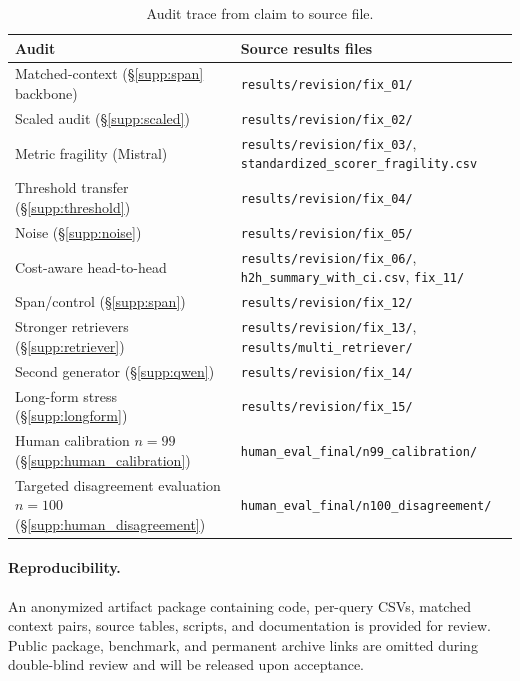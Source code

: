 \documentclass[11pt]{article}
\begin{document}
\begin{table}[!htb]
\centering
\caption{Audit trace from claim to source file.}
\label{tab:supp:trace}
\footnotesize
\begin{tabular}{ll}
\toprule
Audit & Source results files \\
\midrule
Matched-context (\S\ref{supp:span} backbone) &
  \texttt{results/revision/fix\_01/} \\
Scaled audit (\S\ref{supp:scaled}) &
  \texttt{results/revision/fix\_02/} \\
Metric fragility (Mistral) &
  \texttt{results/revision/fix\_03/}, \texttt{standardized\_scorer\_fragility.csv} \\
Threshold transfer (\S\ref{supp:threshold}) &
  \texttt{results/revision/fix\_04/} \\
Noise (\S\ref{supp:noise}) &
  \texttt{results/revision/fix\_05/} \\
Cost-aware head-to-head &
  \texttt{results/revision/fix\_06/}, \texttt{h2h\_summary\_with\_ci.csv}, \texttt{fix\_11/} \\
Span/control (\S\ref{supp:span}) &
  \texttt{results/revision/fix\_12/} \\
Stronger retrievers (\S\ref{supp:retriever}) &
  \texttt{results/revision/fix\_13/}, \texttt{results/multi\_retriever/} \\
Second generator (\S\ref{supp:qwen}) &
  \texttt{results/revision/fix\_14/} \\
Long-form stress (\S\ref{supp:longform}) &
  \texttt{results/revision/fix\_15/} \\
Human calibration $n=99$ (\S\ref{supp:human_calibration}) &
  \texttt{human\_eval\_final/n99\_calibration/} \\
Targeted disagreement evaluation $n=100$ (\S\ref{supp:human_disagreement}) &
  \texttt{human\_eval\_final/n100\_disagreement/} \\
\bottomrule
\end{tabular}
\end{table}

\paragraph{Reproducibility.} An anonymized artifact package containing
code, per-query CSVs, matched context pairs, source tables, scripts, and
documentation is provided for review. Public package, benchmark, and
permanent archive links are omitted during double-blind review and will
be released upon acceptance.
\end{document}
